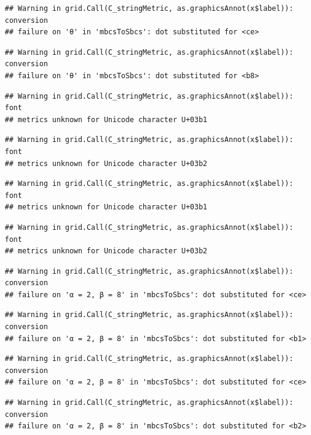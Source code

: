 \documentclass[]{book}
\theoremstyle{definition}
\theoremstyle{definition}
\theoremstyle{definition}
\theoremstyle{remark}
\begin{document}
\begin{verbatim}
## Warning in grid.Call(C_stringMetric, as.graphicsAnnot(x$label)): conversion
## failure on 'θ' in 'mbcsToSbcs': dot substituted for <ce>
\end{verbatim}

\begin{verbatim}
## Warning in grid.Call(C_stringMetric, as.graphicsAnnot(x$label)): conversion
## failure on 'θ' in 'mbcsToSbcs': dot substituted for <b8>
\end{verbatim}

\begin{verbatim}
## Warning in grid.Call(C_stringMetric, as.graphicsAnnot(x$label)): font
## metrics unknown for Unicode character U+03b1
\end{verbatim}

\begin{verbatim}
## Warning in grid.Call(C_stringMetric, as.graphicsAnnot(x$label)): font
## metrics unknown for Unicode character U+03b2
\end{verbatim}

\begin{verbatim}
## Warning in grid.Call(C_stringMetric, as.graphicsAnnot(x$label)): font
## metrics unknown for Unicode character U+03b1
\end{verbatim}

\begin{verbatim}
## Warning in grid.Call(C_stringMetric, as.graphicsAnnot(x$label)): font
## metrics unknown for Unicode character U+03b2
\end{verbatim}

\begin{verbatim}
## Warning in grid.Call(C_stringMetric, as.graphicsAnnot(x$label)): conversion
## failure on 'α = 2, β = 8' in 'mbcsToSbcs': dot substituted for <ce>
\end{verbatim}

\begin{verbatim}
## Warning in grid.Call(C_stringMetric, as.graphicsAnnot(x$label)): conversion
## failure on 'α = 2, β = 8' in 'mbcsToSbcs': dot substituted for <b1>
\end{verbatim}

\begin{verbatim}
## Warning in grid.Call(C_stringMetric, as.graphicsAnnot(x$label)): conversion
## failure on 'α = 2, β = 8' in 'mbcsToSbcs': dot substituted for <ce>
\end{verbatim}

\begin{verbatim}
## Warning in grid.Call(C_stringMetric, as.graphicsAnnot(x$label)): conversion
## failure on 'α = 2, β = 8' in 'mbcsToSbcs': dot substituted for <b2>
\end{verbatim}
\end{document}

